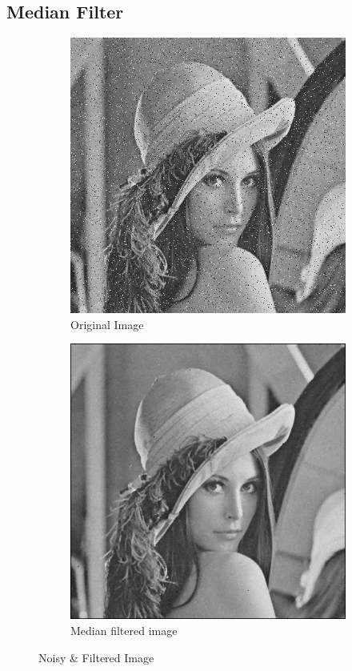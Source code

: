 \documentclass[a4paper,16pt]{article}
\begin{document}
	\subsection{Median Filter}
	\vspace{0.2in}
	
	\begin{figure}[h!]
		\begin{subfigure}[h]{0.45\linewidth}
			\includegraphics[width=\linewidth]{salt}
			\caption{Original Image}
		\end{subfigure}
		\hfill
		\begin{subfigure}[h]{0.45\linewidth}
			\includegraphics[width=\linewidth]{medianfilt}
			\caption{Median filtered image}
		\end{subfigure}%
		\caption{Noisy \& Filtered Image}
	\end{figure}
	\newpage
\end{document}
